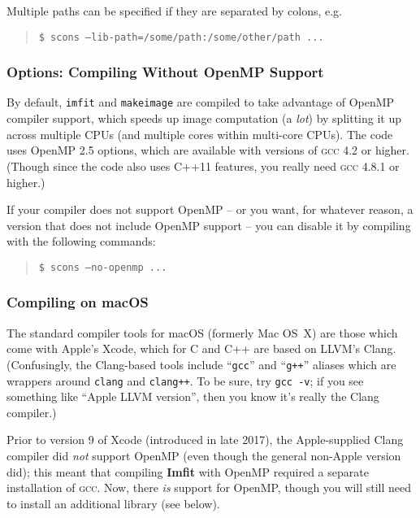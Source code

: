 \documentclass[10pt,a4paper,article]{memoir}
\newcommand{\imfit}{\textbf{Imfit}}
\newcommand{\imfitprog}{\texttt{imfit}}
\newcommand{\makeimage}{\texttt{makeimage}}
\begin{document}
Multiple paths can be specified if they are separated by colons, e.g.
\begin{quote}
\texttt{\$ scons --lib-path=/some/path:/some/other/path ...} \\
\end{quote}



\subsubsection{Options: Compiling Without OpenMP Support}

By default, \imfitprog{} and \makeimage{} are compiled to take advantage
of OpenMP compiler support, which speeds up image computation (a
\textit{lot}) by splitting it up across multiple CPUs (and multiple
cores within multi-core CPUs). The code uses OpenMP 2.5 options, which
are available with versions of \textsc{gcc} 4.2 or higher. (Though since
the code also uses C++11 features, you really need \textsc{gcc} 4.8.1 or
higher.)

If your compiler
does not support OpenMP -- or you want, for whatever reason, a version
that does not include OpenMP support -- you can disable it by compiling
with the following commands:
\begin{quote}
\texttt{\$ scons --no-openmp ...}
\end{quote}


\subsubsection{Compiling on macOS}

The standard compiler tools for macOS (formerly Mac OS~X) are those
which come with Apple's Xcode, which for C and C++ are based on LLVM's
Clang. (Confusingly, the Clang-based tools include ``\texttt{gcc}'' and
``\texttt{g++}'' aliases which are wrappers around \texttt{clang} and
\texttt{clang++}. To be sure, try \texttt{gcc -v}; if you see something
like ``Apple LLVM version'', then you know it's really the Clang
compiler.)

Prior to version 9 of Xcode (introduced in late 2017), the
Apple-supplied Clang compiler did \textit{not} support OpenMP (even though
the general non-Apple version did); this meant
that compiling \imfit{} with OpenMP required a separate installation
of \textsc{gcc}. Now, there \textit{is} support for OpenMP, though
you will still need to install an additional library (see below).
\end{document}
